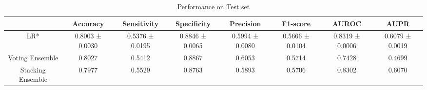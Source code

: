 \begin{table}[h!]
    \centering
    \caption{Performance on Test set}
    \begin{adjustbox}{width=\textwidth}
    \begin{tabular}{|c|c|c|c|c|c|c|c|}
    \hline
      & Accuracy & Sensitivity & Specificity & Precision & F1-score & AUROC & AUPR \\
    \hline
    LR* & 0.8003 ± 0.0030 & 0.5376 ± 0.0195 & 0.8846 ± 0.0065 & 0.5994 ± 0.0080 & 0.5666 ± 0.0104 & 0.8319 ± 0.0006 & 0.6079 ± 0.0019 \\
    \hline
    Voting Ensemble & 0.8027 & 0.5412 & 0.8867 & 0.6053 & 0.5714 & 0.7428 & 0.4699 \\
    \hline
    Stacking Ensemble & 0.7977 & 0.5529 & 0.8763 & 0.5893 & 0.5706 & 0.8302 & 0.6070 \\
    \hline
    \end{tabular}
    \end{adjustbox}
    \end{table}
    